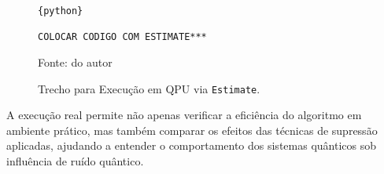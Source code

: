 \begin{figure}[!htb]
\centering
\caption{Trecho para Execução em QPU via \texttt{Estimate}.} 
\begin{lstlisting}{python}

COLOCAR CODIGO COM ESTIMATE***

\end{lstlisting}
{\small Fonte: do autor} 
\label{cod:execucaoEstimate} 
\end{figure}

A execução real permite não apenas verificar a eficiência do algoritmo em ambiente prático, mas também comparar os efeitos das técnicas de supressão aplicadas, ajudando a entender o comportamento dos sistemas quânticos sob influência de ruído quântico.


